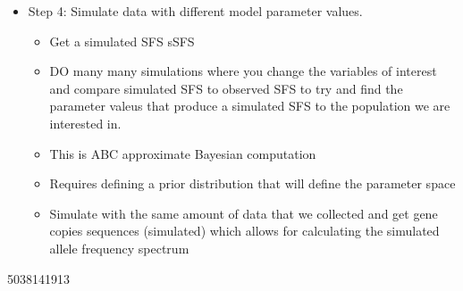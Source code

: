 \documentclass[11pt]{article}
\begin{document}
\begin{itemize}
\begin{itemize}
\begin{itemize}
\begin{itemize}
			\end{itemize}
			\item Step 4: Simulate data with different model parameter values.
			\begin{itemize}
				\item Get a simulated SFS sSFS
				\item DO many many simulations where you change the variables of interest and compare simulated SFS to observed SFS to try and find the parameter valeus that produce a simulated SFS to the population we are interested in.
				\item This is ABC approximate Bayesian computation
				\item Requires defining a prior distribution that will define the parameter space
				\item Simulate with the same amount of data that
				we collected and get gene copies sequences (simulated) which allows for calculating the
				simulated allele frequency spectrum 
				 
			\end{itemize}
		\end{itemize}
	\end{itemize}
\end{itemize}

5038141913


\pagebreak


\end{document}
